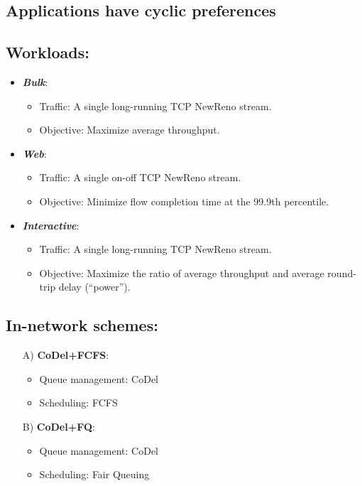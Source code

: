 {\begin{multicols}{2}
\section*{Applications have cyclic preferences}
\subsection*{Workloads:}
\begin{itemize}

\item \textbf{\emph{Bulk}}: 
  \begin{itemize}
  \item Traffic: A single long-running TCP NewReno stream.
  \item Objective: Maximize average throughput.
  \end{itemize}

\item \textbf{\emph{Web}}:
  \begin{itemize}
  \item Traffic: A single on-off TCP NewReno stream.
  \item Objective: Minimize flow completion time at the 99.9th percentile.
  \end{itemize}

\item \textbf{\emph{Interactive}}:
  \begin{itemize}
  \item Traffic: A single long-running TCP NewReno stream.
  \item Objective: Maximize the ratio of average throughput and average
  round-trip delay (``power'').
  \end{itemize}

\end{itemize}


\subsection*{In-network schemes:}
\begin{enumerate}

\item[A)] {\bf CoDel+FCFS}:
  \begin{itemize}
  \item Queue management: CoDel
  \item Scheduling: FCFS
  \end{itemize}

\item[B)] {\bf CoDel+FQ}:
  \begin{itemize}
  \item Queue management: CoDel
  \item Scheduling: Fair Queuing
  \end{itemize}


\end{enumerate}
\end{multicols}}
